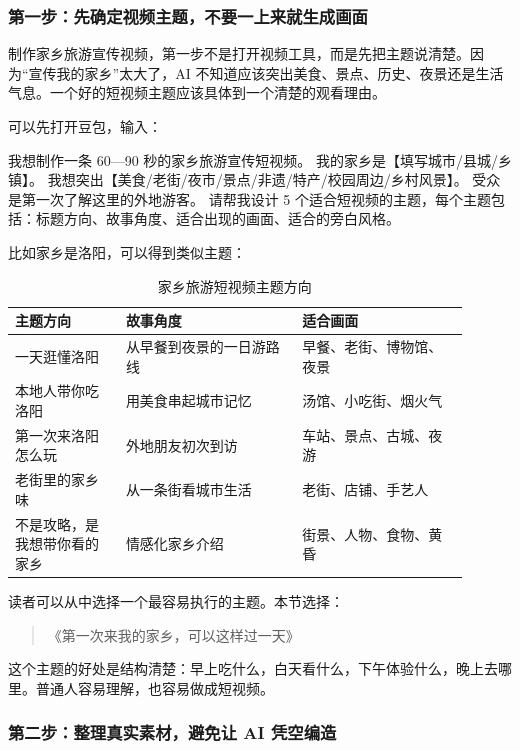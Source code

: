 \subsubsection*{第一步：先确定视频主题，不要一上来就生成画面}

制作家乡旅游宣传视频，第一步不是打开视频工具，而是先把主题说清楚。因为“宣传我的家乡”太大了，AI 不知道应该突出美食、景点、历史、夜景还是生活气息。一个好的短视频主题应该具体到一个清楚的观看理由。

可以先打开豆包，输入：

\begin{tcolorbox}[promptbox]
我想制作一条 60—90 秒的家乡旅游宣传短视频。
我的家乡是【填写城市/县城/乡镇】。
我想突出【美食/老街/夜市/景点/非遗/特产/校园周边/乡村风景】。
受众是第一次了解这里的外地游客。
请帮我设计 5 个适合短视频的主题，每个主题包括：标题方向、故事角度、适合出现的画面、适合的旁白风格。
\end{tcolorbox}

比如家乡是洛阳，可以得到类似主题：

\begin{table}[H]
\centering
\caption{家乡旅游短视频主题方向}
\label{tab:hometour-video-themes}
\begin{tabular}{p{0.22\linewidth} p{0.35\linewidth} p{0.33\linewidth}}
\toprule
\textbf{主题方向} & \textbf{故事角度} & \textbf{适合画面} \\
\midrule
一天逛懂洛阳 & 从早餐到夜景的一日游路线 & 早餐、老街、博物馆、夜景 \\
本地人带你吃洛阳 & 用美食串起城市记忆 & 汤馆、小吃街、烟火气 \\
第一次来洛阳怎么玩 & 外地朋友初次到访 & 车站、景点、古城、夜游 \\
老街里的家乡味 & 从一条街看城市生活 & 老街、店铺、手艺人 \\
不是攻略，是我想带你看的家乡 & 情感化家乡介绍 & 街景、人物、食物、黄昏 \\
\bottomrule
\end{tabular}
\end{table}

读者可以从中选择一个最容易执行的主题。本节选择：
\begin{quote}
《第一次来我的家乡，可以这样过一天》
\end{quote}

这个主题的好处是结构清楚：早上吃什么，白天看什么，下午体验什么，晚上去哪里。普通人容易理解，也容易做成短视频。

\subsubsection*{第二步：整理真实素材，避免让 AI 凭空编造}

